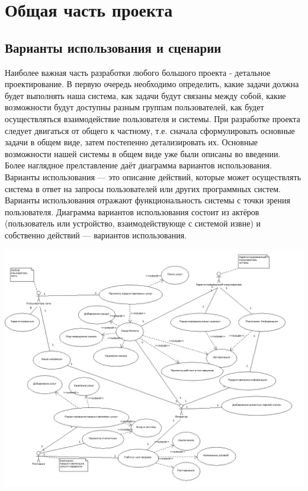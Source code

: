 \section{Общая часть проекта}

\subsection{Варианты использования и сценарии}

Наиболее важная часть разработки любого большого проекта - детальное проектирование. В первую очередь необходимо определить, какие задачи должна будет выполнять наша система, как задачи будут связаны между собой, какие возможности будут доступны разным группам пользователей, как будет осуществляться взаимодействие пользователя и системы. 
При разработке проекта следует двигаться от общего к частному, т.е. сначала сформулировать основные задачи в общем виде, затем постепенно детализировать их. Основные возможности нашей системы в общем виде уже были описаны во введении. Более наглядное прелставление даёт диаграмма вариантов использования. Варианты использования --- это описание действий, которые может осуществлять система в ответ на запросы пользователей или других программных систем. Варианты использования отражают функциональность системы с точки зрения пользователя. Диаграмма вариантов использования состоит из актёров (пользователь или устройство, взаимодействующе с системой извне) и собственно действий --- вариантов использования.

\includegraphics*[width=18cm]{images/usecases.png}

